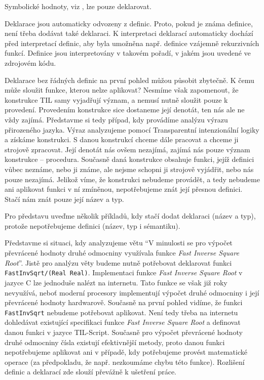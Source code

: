 Symbolické hodnoty, viz , lze pouze deklarovat.

Deklarace jsou automaticky odvozeny z definic. Proto, pokud je známa definice, není třeba dodávat
také deklaraci. K interpretaci deklarací automaticky dochází před interpretací definic, aby byla
umožněna např. definice vzájemně rekurzivních funkcí. Definice jsou interpretovány v takovém
pořadí, v jakém jsou uvedené ve zdrojovém kódu.

Deklarace bez řádných definic na první pohled můžou působit zbytečně. K čemu může sloužit funkce,
kterou nelze aplikovat? Nesmíme však zapomenout, že konstrukce TIL samy vyjadřují význam, a nemusí
nutně sloužit pouze k provedení. Provedením konstrukce sice dostaneme její denotát, ten nás ale ne
vždy zajímá. Představme si tedy případ, kdy provádíme analýzu výrazu přirozeného jazyka. Výraz
analyzujeme pomocí Transparentní intenzionální logiky a získáme konstrukci. S danou konstrukcí
chceme dále pracovat a chceme ji strojově zpracovat. Její denotát nás ovšem nezajímá, zajímá nás
pouze význam konstrukce -- procedura. Současně daná konstrukce obsahuje funkci, jejíž definici vůbec
neznáme, nebo ji známe, ale nejsme schopni ji strojově vyjádřit, nebo nás pouze nezajímá. Jelikož
víme, že konstrukci nebudeme provádět, a tedy nebudeme ani aplikovat funkci v ní zmíněnou,
nepotřebujeme znát její přesnou definici. Stačí nám znát pouze její název a typ.

Pro představu uveďme několik příkladů, kdy stačí dodat deklaraci (název a typ), protože
nepotřebujeme definici (název, typ i sémantiku).

Představme si situaci, kdy analyzujeme větu ``V minulosti se pro výpočet převrácené hodnoty druhé
odmocniny využívala funkce \textit{Fast Inverse Square Root}''. Jistě pro analýzu věty budeme
nutně potřebovat deklarovat funkci \lstinline{FastInvSqrt/(Real Real)}. Implementaci funkce
\textit{Fast Inverse Square Root} v jazyce C lze jednoduše nalézt na internetu. Tato funkce se však
již roky nevyužívá, neboť moderní procesory implementují výpočet druhé odmocniny i její převrácené
hodnoty hardwarově. Současně na první pohled vidíme, že funkci \lstinline{FastInvSqrt} nebudeme
potřebovat aplikovat. Není tedy třeba na internetu dohledávat existující specifikaci funkce
\textit{Fast Inverse Square Root} a definovat danou funkci v jazyce TIL-Script. Současně pro výpočet
převrácené hodnoty druhé odmocniny čísla existují efektivnější metody, proto danou funkci
nepotřebujeme aplikovat ani v případě, kdy potřebujeme provést matematické operace (za předpokladu,
že např. nezkoumáme chybu této funkce). Rozlišení definic a deklarací zde slouží převážně k ušetření
práce.

